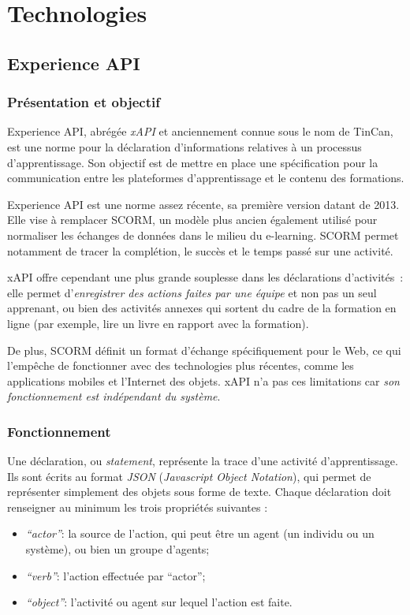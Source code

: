 \chapter{Technologies}

    \section{Experience API  }

        \subsection{Présentation et objectif}

            Experience API, abrégée \emph{xAPI} et anciennement connue sous le nom de TinCan, est une norme pour la déclaration d’informations relatives à un processus d’apprentissage. Son objectif est de mettre en place une spécification pour la communication entre les plateformes d’apprentissage et le contenu des formations.

            Experience API est une norme assez récente, sa première version datant de 2013. Elle vise à remplacer SCORM, un modèle plus ancien également utilisé pour normaliser les échanges de données dans le milieu du e-learning. SCORM permet notamment de tracer la complétion, le succès et le temps passé sur une activité.

            xAPI offre cependant une plus grande souplesse dans les déclarations d’activités~: elle permet d’\emph{enregistrer des actions faites par une équipe} et non pas un seul apprenant, ou bien des activités annexes qui sortent du cadre de la formation en ligne (par exemple, lire un livre en rapport avec la formation). 

            De plus, SCORM définit un format d’échange spécifiquement pour le Web, ce qui l’empêche de fonctionner avec des technologies plus récentes, comme les applications mobiles et l’Internet des objets. xAPI n’a pas ces limitations car \emph{son fonctionnement est indépendant du système}.

        \subsection{Fonctionnement}

            \def\myitem#1{\item \emph{\enquote{#1}}:\hspace{2mm}}

            Une déclaration, ou \emph{statement}, représente la trace d’une activité d’apprentissage. Ils sont écrits au format \emph{JSON} (\emph{Javascript Object Notation}), qui permet de représenter simplement des objets sous forme de texte. Chaque déclaration doit renseigner au minimum les trois propriétés suivantes :
            \begin{itemize}
                \myitem{actor} la source de l’action, qui peut être un agent (un individu ou un système), ou bien un groupe d’agents;
                \myitem{verb} l’action effectuée par \enquote{actor};
                \myitem{object} l’activité ou agent sur lequel l’action est faite.
            \end{itemize}

